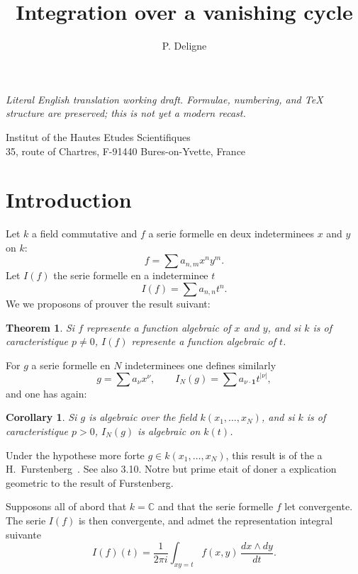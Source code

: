 \documentclass[12pt,a4paper]{article}
\title{Integration over a vanishing cycle}
\author{P. Deligne}
\date{}
\theoremstyle{plain}
\newtheorem{theorem}{Theorem}
\newtheorem{corollary}{Corollary}
\theoremstyle{definition}
\theoremstyle{remark}
\newcommand{\CC}{\mathbb{C}}
\providecommand{\CC}{\mathbb{C}}
\begin{document}
\begin{center}\small\emph{Literal English translation working draft. Formulae, numbering, and TeX structure are preserved; this is not yet a modern recast.}\end{center}
\vspace{0.5em}

\maketitle

\begin{center}
Institut of the Hautes Etudes Scientifiques\\
35, route of Chartres, F-91440 Bures-on-Yvette, France
\end{center}

\section*{Introduction}

Let $k$ a field commutative and $f$ a serie formelle en deux indeterminees $x$
and $y$ on $k$:
\[
f=\sum a_{n,m} x^n y^m .
\]
Let $I(f)$ the serie formelle en a indeterminee $t$
\[
I(f)=\sum a_{n,n} t^n .
\]
We we proposons of prouver the result suivant:

\begin{theorem}
Si $f$ represente a function algebraic of $x$ and $y$, and si $k$ is of
caracteristique $p\neq 0$, $I(f)$ represente a function algebraic of $t$.
\end{theorem}

For $g$ a serie formelle en $N$ indeterminees one defines similarly
\[
g=\sum a_\nu x^\nu, \qquad I_N(g)=\sum a_{\nu\cdot\mathbf{1}} t^{|\nu|},
\]
and one has again:

\begin{corollary}
Si $g$ is algebraic over the field $k(x_1,\dots,x_N)$, and si $k$ is of
caracteristique $p>0$, $I_N(g)$ is algebraic on $k(t)$.
\end{corollary}

Under the hypothese more forte $g\in k(x_1,\dots,x_N)$, this result is of the a
H.~Furstenberg~\cite{Furstenberg}. See also 3.10. Notre but prime etait of
doner a explication geometric to the result of Furstenberg.

Supposons all of abord that $k=\CC$ and that the serie formelle $f$ let convergente.
The serie $I(f)$ is then convergente, and admet the representation integral suivante
\begin{equation}\label{eq:1}
I(f)(t)=\frac{1}{2\pi i}\int_{xy=t} f(x,y)\,\frac{dx\wedge dy}{dt}.
\end{equation}
\end{document}
